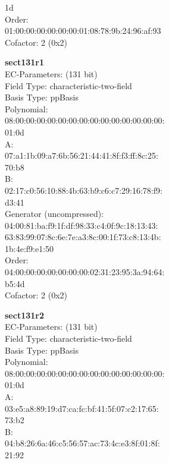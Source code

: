     1d\\
Order: \\
    01:00:00:00:00:00:00:01:08:78:9b:24:96:af:93\\
Cofactor:  2 (0x2)\\
\item \textbf{ sect131r1 }\\
EC-Parameters: (131 bit)\\
Field Type: characteristic-two-field\\
Basis Type: ppBasis\\
Polynomial:\\
    08:00:00:00:00:00:00:00:00:00:00:00:00:00:00:\\
    01:0d\\
A:   \\
    07:a1:1b:09:a7:6b:56:21:44:41:8f:f3:ff:8c:25:\\
    70:b8\\
B:   \\
    02:17:c0:56:10:88:4b:63:b9:c6:c7:29:16:78:f9:\\
    d3:41\\
Generator (uncompressed):\\
    04:00:81:ba:f9:1f:df:98:33:c4:0f:9c:18:13:43:\\
    63:83:99:07:8c:6e:7e:a3:8c:00:1f:73:c8:13:4b:\\
    1b:4e:f9:e1:50\\
Order: \\
    04:00:00:00:00:00:00:00:02:31:23:95:3a:94:64:\\
    b5:4d\\
Cofactor:  2 (0x2)\\
\item \textbf{ sect131r2 }\\
EC-Parameters: (131 bit)\\
Field Type: characteristic-two-field\\
Basis Type: ppBasis\\
Polynomial:\\
    08:00:00:00:00:00:00:00:00:00:00:00:00:00:00:\\
    01:0d\\
A:   \\
    03:e5:a8:89:19:d7:ca:fc:bf:41:5f:07:c2:17:65:\\
    73:b2\\
B:   \\
    04:b8:26:6a:46:c5:56:57:ac:73:4c:e3:8f:01:8f:\\
    21:92\\
